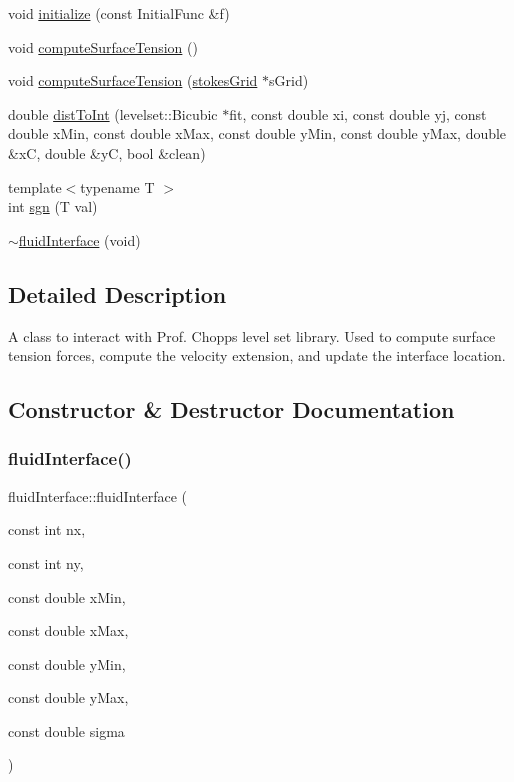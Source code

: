 \begin{DoxyCompactItemize}
\item 
void \hyperlink{classfluidInterface_acf05896dd2ad5e6c43d4e4c77098b5fa}{initialize} (const Initial\+Func \&f)
\item 
void \hyperlink{classfluidInterface_aff4f820adb536fe0f36940f61348c03b}{compute\+Surface\+Tension} ()
\item 
void \hyperlink{classfluidInterface_a3e675a8c9b31ceb1dd1e58791edb9988}{compute\+Surface\+Tension} (\hyperlink{classstokesGrid}{stokes\+Grid} $\ast$s\+Grid)
\item 
double \hyperlink{classfluidInterface_a83e14fb63e907f03973abb5124c87dfa}{dist\+To\+Int} (levelset\+::\+Bicubic $\ast$fit, const double xi, const double yj, const double x\+Min, const double x\+Max, const double y\+Min, const double y\+Max, double \&xC, double \&yC, bool \&clean)
\item 
{\footnotesize template$<$typename T $>$ }\\int \hyperlink{classfluidInterface_ac1923b87f580cee256b6f12136970acc}{sgn} (T val)
\item 
\hyperlink{classfluidInterface_aae189149ce71b7a7484c4cf8a286e4b3}{$\sim$fluid\+Interface} (void)
\end{DoxyCompactItemize}


\subsection{Detailed Description}
A class to interact with Prof. Chopp\textquotesingle{}s level set library. Used to compute surface tension forces, compute the velocity extension, and update the interface location. 

\subsection{Constructor \& Destructor Documentation}
\mbox{\label{classfluidInterface_a14208ac17406c5acad330d80f5440854}} 
\subsubsection{\texorpdfstring{fluid\+Interface()}{fluidInterface()}}
{\footnotesize\ttfamily fluid\+Interface\+::fluid\+Interface (\begin{DoxyParamCaption}\item[{const int}]{nx,  }\item[{const int}]{ny,  }\item[{const double}]{x\+Min,  }\item[{const double}]{x\+Max,  }\item[{const double}]{y\+Min,  }\item[{const double}]{y\+Max,  }\item[{const double}]{sigma }\end{DoxyParamCaption})}

